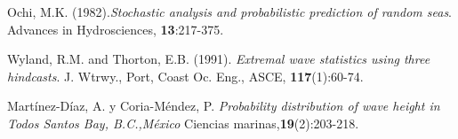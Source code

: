 \begin{thebibliography}{XXX}

 Ochi, M.K. (1982).{\em Stochastic analysis and 
probabilistic prediction of random seas}. { Advances in 
Hydrosciences}, {\bf 13}:217-375.


 Wyland, R.M. and Thorton, E.B. (1991). {\em Extremal 
wave statistics using three hindcasts}. { J. Wtrwy., Port, Coast Oc. 
Eng., ASCE}, {\bf 117}(1):60-74.

 Mart\'inez-D\'iaz, A. y Coria-M\'endez, P. {\em 
Probability distribution of wave height in Todos Santos Bay, B.C.,M\'exico} 
Ciencias marinas,{\bf 19}(2):203-218. 

\end{thebibliography}
